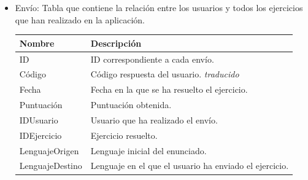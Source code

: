 \begin{itemize}
\item Envío: Tabla que contiene la relación entre los usuarios y todos los ejercicios que han realizado en la aplicación.

\begin{tabularx}{14cm}{|l|X|}
\hline
\textbf{Nombre} & \textbf{Descripción}                                                              \\ \hline
ID       & ID correspondiente a cada envío. \\ \hline
Código     & Código respuesta del usuario. \emph{traducido}                                           \\ \hline
Fecha     & Fecha en la que se ha resuelto el ejercicio.                                           \\ \hline
Puntuación     & Puntuación obtenida.                                           \\ \hline
IDUsuario     & Usuario que ha realizado el envío.                                           \\ \hline
IDEjercicio     & Ejercicio resuelto.                                           \\ \hline
LenguajeOrigen     & Lenguaje inicial del enunciado.                                           \\ \hline
LenguajeDestino     & Lenguaje en el que el usuario ha enviado el ejercicio.                                           \\ \hline
\end{tabularx}

\end{itemize}